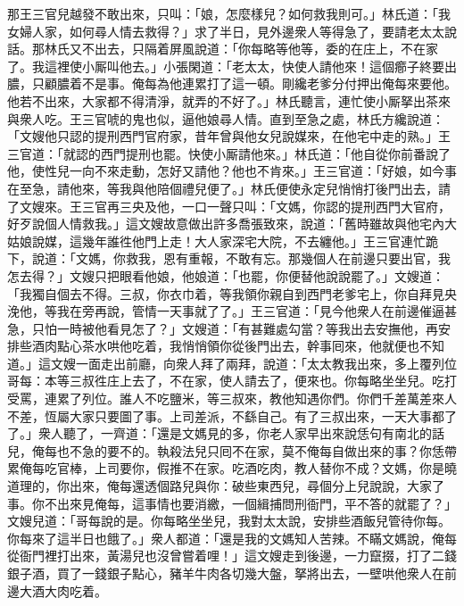 那王三官兒越發不敢出來，只叫：「娘，怎麼樣兒？如何救我則可。」林氏道：「我女婦人家，如何尋人情去救得？」求了半日，見外邊衆人等得急了，要請老太太說話。那林氏又不出去，只隔着屏風說道：「你每略等他等，委的在庄上，不在家了。我這裡使小厮叫他去。」小張閑道：「老太太，快使人請他來！這個癤子終要出膿，只顧膿着不是事。{}俺每為他連累打了這一頓。剛纔老爹分付押出俺每來要他。他若不出來，大家都不得清淨，就弄的不好了。」林氏聽言，連忙使小厮拏出茶來與衆人吃。王三官唬的鬼也似，逼他娘尋人情。{}直到至急之處，林氏方纔說道：「文嫂他只認的提刑西門官府家，昔年曾與他女兒說媒來，在他宅中走的熟。」王三官道：「就認的西門提刑也罷。快使小厮請他來。」林氏道：「他自從你前番說了他，使性兒一向不來走動，怎好又請他？他也不肯來。」王三官道：「好娘，如今事在至急，請他來，等我與他陪個禮兒便了。」{}林氏便使永定兒悄悄打後門出去，請了文嫂來。王三官再三央及他，一口一聲只叫：{}「文媽，你認的提刑西門大官府，好歹說個人情救我。」這文嫂故意做出許多喬張致來，說道：「舊時雖故與他宅內大姑娘說媒，這幾年誰徃他門上走！大人家深宅大院，不去纏他。」王三官連忙跪下，{}說道：「文媽，你救我，恩有重報，不敢有忘。那幾個人在前邊只要出官，我怎去得？」文嫂只把眼看他娘，他娘道：「也罷，你便替他說說罷了。」文嫂道：「我獨自個去不得。三叔，你衣巾着，等我領你親自到西門老爹宅上，你自拜見央浼他，等我在旁再說，管情一天事就了了。」王三官道：「見今他衆人在前邊催逼甚急，只怕一時被他看見怎了？」文嫂道：「有甚難處勾當？等我出去安撫他，再安排些酒肉點心茶水哄他吃着，我悄悄領你從後門出去，幹事囘來，他就便也不知道。」這文嫂一面走出前廳，向衆人拜了兩拜，說道：「太太教我出來，多上覆列位哥每：本等三叔徃庄上去了，不在家，使人請去了，便來也。你每略坐坐兒。吃打受罵，連累了列位。誰人不吃鹽米，等三叔來，教他知遇你們。你們千差萬差來人不差，恆屬大家只要圖了事。上司差派，不繇自己。有了三叔出來，一天大事都了了。」衆人聽了，一齊道：「還是文媽見的多，你老人家早出來說恁句有南北的話兒，俺每也不急的要不的。執殺法兒只囘不在家，莫不俺每自做出來的事？你恁帶累俺每吃官棒，上司要你，假推不在家。吃酒吃肉，教人替你不成？文媽，你是曉道理的，你出來，俺每還透個路兒與你：破些東西兒，尋個分上兒說說，大家了事。你不出來見俺每，這事情也要消繳，一個緝捕問刑衙門，平不答的就罷了？」文嫂兒道：「哥每說的是。你每略坐坐兒，我對太太說，安排些酒飯兒管待你每。你每來了這半日也餓了。」衆人都道：「還是我的文媽知人苦辣。不瞞文媽說，俺每從衙門裡打出來，黃湯兒也沒曾嘗着哩！」這文嫂走到後邊，一力竄掇，打了二錢銀子酒，買了一錢銀子點心，豬羊牛肉各切幾大盤，拏將出去，一壁哄他衆人在前邊大酒大肉吃着。

